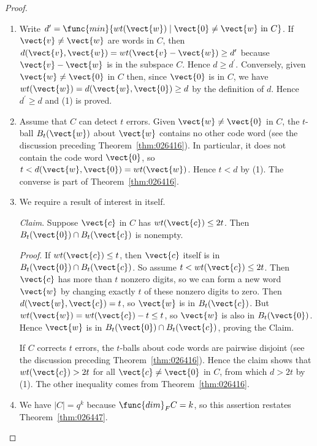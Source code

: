 \begin{proof}
\begin{enumerate}
\item Write $d^{\prime} = \func{min}\{wt(\vect{w}) \mid \vect{0} \neq \vect{w} \mbox{ in } C\}$. If $\vect{v} \neq \vect{w}$ are words in $C$, then $d(\vect{v}, \vect{w}) = wt(\vect{v} - \vect{w}) \geq d^{\prime}$ because $\vect{v} - \vect{w}$ is in the subspace $C$. Hence $d \geq d^{\prime}$. Conversely, given $\vect{w} \neq \vect{0}$ in $C$ then, since $\vect{0}$ is in $C$, we have $wt(\vect{w}) = d(\vect{w}, \vect{0}) \geq d$ by the definition of $d$. Hence $d^{\prime} \geq d$ and (1) is proved.

\item Assume that $C$ can detect $t$ errors. Given $\vect{w} \neq \vect{0}$ in $C$, the $t$-ball $B_{t}(\vect{w})$ about $\vect{w}$ contains no other code word (see the discussion preceding Theorem~\ref{thm:026416}). In particular, it does not contain the code word $\vect{0}$, so $t < d(\vect{w}, \vect{0}) = wt(\vect{w})$. Hence $t < d$ by (1). The converse is part of Theorem~\ref{thm:026416}.

\item We require a result of interest in itself.

\textit{Claim}. Suppose $\vect{c}$ in $C$ has $wt(\vect{c}) \leq 2t$. Then $B_{t}(\vect{0}) \cap B_{t}(\vect{c})$ is nonempty.

\textit{Proof}. If $wt(\vect{c}) \leq t$, then $\vect{c}$ itself is in $B_{t}(\vect{0}) \cap B_{t}(\vect{c})$. So assume $t < wt(\vect{c}) \leq 2t$. Then $\vect{c}$ has more than $t$ nonzero digits, so we can form a new word $\vect{w}$ by changing exactly $t$ of these nonzero digits to zero. Then $d(\vect{w}, \vect{c}) = t$, so $\vect{w}$ is in $B_{t}(\vect{c})$. But $wt(\vect{w}) = wt(\vect{c}) - t \leq t$, so $\vect{w}$ is also in $B_{t}(\vect{0})$. Hence $\vect{w}$ is in $B_{t}(\vect{0}) \cap B_{t}(\vect{c})$, proving the Claim.

If $C$ corrects $t$ errors, the $t$-balls about code words are pairwise disjoint (see the discussion preceding Theorem~\ref{thm:026416}). Hence the claim shows that $wt(\vect{c}) > 2t$ for all $\vect{c} \neq \vect{0}$ in $C$, from which $d > 2t$ by (1). The other inequality comes from Theorem~\ref{thm:026416}.

\item We have $|C| = q^{k}$ because $\func{dim}_{F} C = k$, so this assertion restates Theorem~\ref{thm:026447}.
\end{enumerate}
\vspace*{-2em}\end{proof}

